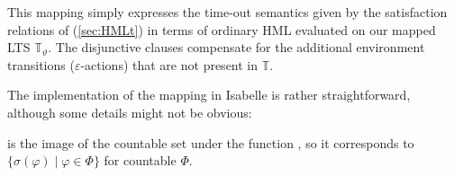 \begin{isabellebody}
\begin{isamarkuptext}
This mapping simply expresses the time-out semantics given by the satisfaction relations of \HMLt{} (\cref{sec:HMLt}) in terms of ordinary HML evaluated on our mapped LTS $\mathbb{T}_\vartheta$. The disjunctive clauses compensate for the additional environment transitions ($\varepsilon$-actions) that are not present in $\mathbb{T}$.
\pagebreak%
\end{isamarkuptext}\isamarkuptrue%
%
\isadelimdocument
%
\endisadelimdocument
%
\isatagdocument
%
\isamarkuptrue%
%
\endisatagdocument
{\isafolddocument}%
%
\isadelimdocument
%
\endisadelimdocument
%
\begin{isamarkuptext}%
The implementation of the mapping in Isabelle is rather straightforward, although some details might not be obvious: 

 is the image of the countable set \isa{{\isasymPhi}} under the function \isa{{\isasymlambda}\ {\isasymphi}{\isachardot}{\kern0pt}\ {\isasymsigma}{\isacharparenleft}{\kern0pt}{\isasymphi}{\isacharparenright}{\kern0pt}}, so it corresponds to $\{ \sigma(\varphi) \mid \varphi \in \Phi \}$ for countable $\Phi$.


\end{isamarkuptext}
\end{isabellebody}
